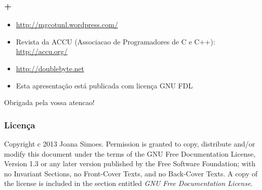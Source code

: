 \documentclass[hyperref={pdfpagelabels=true}]{beamer}
\begin{document}
\begin{frame}
\frametitle{+}

\begin{itemize}
\item<1-> \url{http://mgcotunl.wordpress.com/}
\item<1-> Revista da ACCU (Associacao de Programadores de C e C++): \url{http://accu.org/}
\item<1-> \url{http://doublebyte.net}
\item<1-> Esta apresenta\c{c}\~{a}o est\'{a} publicada com licen\c{c}a GNU FDL
\end{itemize}
\pause
\vspace{1cm}
\huge
Obrigada pela vossa atencao!
\end{frame}

\begin{frame}
\frametitle{Licen\c{c}a}
Copyright c 2013 Joana Simoes. Permission is granted
to copy, distribute and/or modify this document under
the terms of the GNU Free Documentation License,
Version 1.3 or any later version published by the Free
Software Foundation; with no Invariant Sections, no
Front-Cover Texts, and no Back-Cover Texts. A copy of
the license is included in the section entitled \textit{GNU Free
Documentation License}.
\end{frame}


\end{document}
